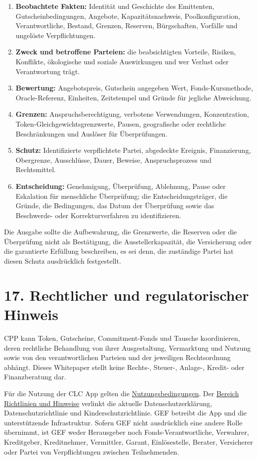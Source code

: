 \documentclass[11pt]{article}
\begin{document}
\begin{enumerate}[leftmargin=*]
\item \textbf{Beobachtete Fakten:} Identität und Geschichte des Emittenten, Gutscheinbedingungen, Angebote, Kapazitätsnachweis, Poolkonfiguration, Verantwortliche, Bestand, Grenzen, Reserven, Bürgschaften, Vorfälle und ungelöste Verpflichtungen.
\item \textbf{Zweck und betroffene Parteien:} die beabsichtigten Vorteile, Risiken, Konflikte, ökologische und soziale Auswirkungen und wer Verlust oder Verantwortung trägt.
\item \textbf{Bewertung:} Angebotspreis, Gutschein angegeben Wert, Fonds-Kursmethode, Oracle-Referenz, Einheiten, Zeitstempel und Gründe für jegliche Abweichung.
\item \textbf{Grenzen:} Anspruchsberechtigung, verbotene Verwendungen, Konzentration, Token-Gleichgewichtsgrenzwerte, Pausen, geografische oder rechtliche Beschränkungen und Auslöser für Überprüfungen.
\item \textbf{Schutz:} Identifizierte verpflichtete Partei, abgedeckte Ereignis, Finanzierung, Obergrenze, Ausschlüsse, Dauer, Beweise, Anspruchsprozess und Rechtsmittel.
\item \textbf{Entscheidung:} Genehmigung, Überprüfung, Ablehnung, Pause oder Eskalation für menschliche Überprüfung; die Entscheidungsträger, die Gründe, die Bedingungen, das Datum der Überprüfung sowie das Beschwerde- oder Korrekturverfahren zu identifizieren.
\end{enumerate}
Die Ausgabe sollte die Aufbewahrung, die Grenzwerte, die Reserven oder die Überprüfung nicht als Bestätigung, die Ausstellerkapazität, die Versicherung oder die garantierte Erfüllung beschreiben, es sei denn, die zuständige Partei hat diesen Schutz ausdrücklich festgestellt.


\section*{17. Rechtlicher und regulatorischer Hinweis}

CPP kann Token, Gutscheine, Commitment-Fonds und Tausche koordinieren, deren rechtliche Behandlung von ihrer Ausgestaltung, Vermarktung und Nutzung sowie von den verantwortlichen Parteien und der jeweiligen Rechtsordnung abhängt. Dieses Whitepaper stellt keine Rechts-, Steuer-, Anlage-, Kredit- oder Finanzberatung dar.

Für die Nutzung der CLC App gelten die \href{https://docs.cosmolocal.credit/de/governance/terms}{Nutzungsbedingungen}. Der \href{https://docs.cosmolocal.credit/de/governance/policies}{Bereich Richtlinien und Hinweise} verlinkt die aktuelle Datenschutzerklärung, Datenschutzrichtlinie und Kinderschutzrichtlinie. GEF betreibt die App und die unterstützende Infrastruktur. Sofern GEF nicht ausdrücklich eine andere Rolle übernimmt, ist GEF weder Herausgeber noch Fonds-Verantwortliche, Verwahrer, Kreditgeber, Kreditnehmer, Vermittler, Garant, Einlösestelle, Berater, Versicherer oder Partei von Verpflichtungen zwischen Teilnehmenden.
\end{document}
